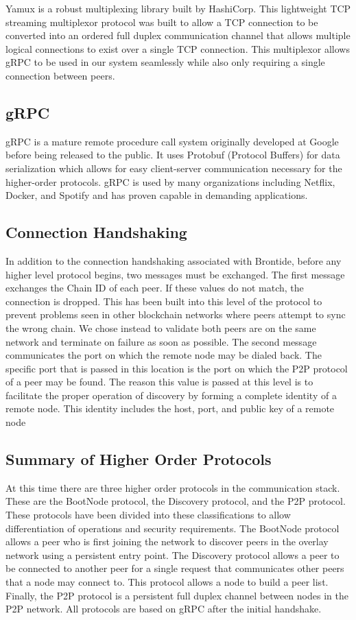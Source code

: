 Yamux is a robust multiplexing library built by HashiCorp.
This lightweight TCP streaming multiplexor protocol was built to allow
a TCP connection to be converted into an ordered full duplex
communication channel that allows multiple logical connections to exist
over a single TCP connection.
This multiplexor allows gRPC to be used in our system seamlessly while
also only requiring a single connection between peers.

\subsection{gRPC}

gRPC is a mature remote procedure call system originally developed at
Google before being released to the public.
It uses Protobuf (Protocol Buffers) for data serialization which allows
for easy client-server communication necessary for the higher-order
protocols.
gRPC is used by many organizations including Netflix, Docker, and
Spotify and has proven capable in demanding applications.

\subsection{Connection Handshaking}

In addition to the connection handshaking associated with Brontide,
before any higher level protocol begins, two messages must be exchanged.
The first message exchanges the Chain ID of each peer.
If these values do not match, the connection is dropped.
This has been built into this level of the protocol to prevent problems
seen in other blockchain networks where peers attempt to sync the wrong chain.
We chose instead to validate both peers are on the same network and
terminate on failure as soon as possible.
The second message communicates the port on which the remote node may
be dialed back.
The specific port that is passed in this location is the port on which
the P2P protocol of a peer may be found.
The reason this value is passed at this level is to facilitate the
proper operation of discovery by forming a complete identity of a
remote node.
This identity includes the host, port, and public key of a remote
node

\subsection{Summary of Higher Order Protocols}

At this time there are three higher order protocols in the
communication stack.
These are the BootNode protocol, the Discovery protocol, and the P2P
protocol.
These protocols have been divided into these classifications to allow
differentiation of operations and security requirements.
The BootNode protocol allows a peer who is first joining the network to
discover peers in the overlay network using a persistent entry point.
The Discovery protocol allows a peer to be connected to another peer
for a single request that communicates other peers that a node may
connect to.
This protocol allows a node to build a peer list.
Finally, the P2P protocol is a persistent full duplex channel between
nodes in the P2P network.
All protocols are based on gRPC after the initial handshake.


